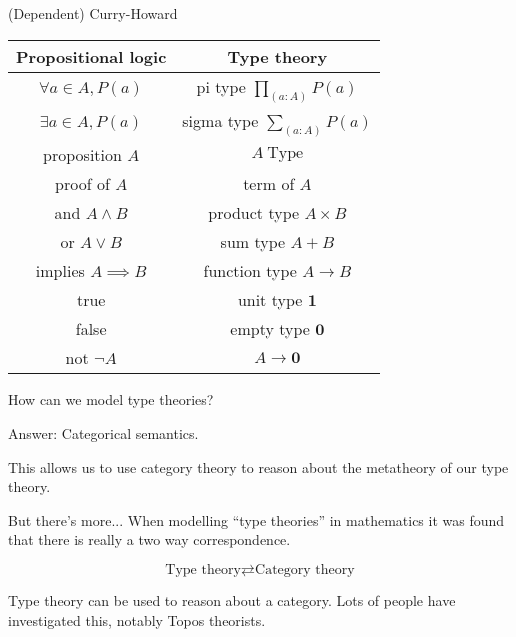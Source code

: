 \documentclass[usenames,dvipsnames]{beamer}
\begin{document}
    
    \begin{frame}{(Dependent) Curry-Howard}
        \begin{table}
            \begin{tabular}{c || c}
                \textbf{Propositional logic} & \textbf{Type theory} \\
                \hline\hline
                $\forall a \in A, P(a)$ & pi type $\prod_{(a : A)}P(a)$     \\
                $\exists a \in A, P(a)$ & sigma type $\sum_{(a:A)}P(a)$     \\
                proposition $A$         & $A\ \text{Type}$                  \\
                proof of $A$            & term of $A$                       \\
                and $A \land B$         & product type $A \times B$         \\
                or $A \lor B$           & sum type $A + B$                  \\
                implies $A \implies B$  & function type $A \to B$           \\
                true                    & unit type $\mathbf{1}$            \\
                false                   & empty type $\mathbf{0}$           \\
                not $¬A$                & $A \to \mathbf{0}$                \\
            \end{tabular}
        \end{table}
    \end{frame}
    
    \begin{frame}{How can we model type theories?}
        \begin{block}{Answer:}
            Categorical semantics.
        \end{block}
        This allows us to use category theory to reason about the metatheory of our type theory.
        
        \begin{block}{But there's more...}
            When modelling ``type theories'' in mathematics it was found that there is really a two way correspondence.
            
            $$\text{Type theory} \rightleftarrows \text{Category theory}$$
            
            Type theory can be used to reason about a category. Lots of people have investigated this, notably Topos theorists.
        \end{block}
        
    \end{frame}
    
\end{document}
